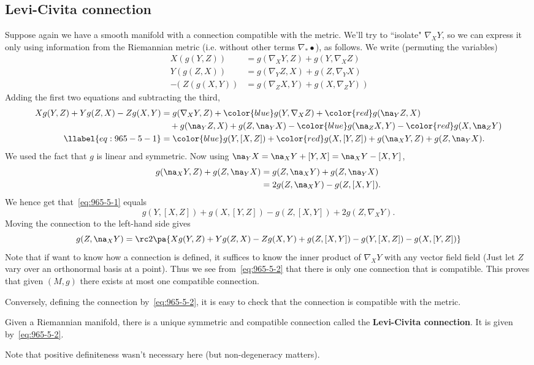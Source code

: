 \subsection{Levi-Civita connection}
Suppose again we have a smooth manifold with a connection compatible with the metric. We'll try to ``isolate" $\nabla_XY$, so we can express it only using information from the Riemannian metric (i.e. without other terms $\nabla_*\bullet$), as follows. We write (permuting the variables)
\begin{align*}
X(g(Y,Z))&=g(\nabla_XY,Z)+g(Y,\nabla_XZ)\\
Y(g(Z,X))&=g(\nabla_YZ,X)+g(Z,\nabla_YX)\\
-(\;Z(g(X,Y))&=g(\nabla_ZX,Y)+g(X,\nabla_ZY)\;)
\end{align*}
Adding the first two equations and subtracting the third,
\begin{align}
\nonumber
Xg(Y,Z)+Yg(Z,X)-Zg(X,Y)
&=g(\nabla_XY,Z)+{\color{blue}g(Y,\nabla_XZ)}+{\color{red}g(\na_YZ,X)}\\
\nonumber
&\quad
+g(\na_YZ,X)+g(Z,\na_YX)-{\color{blue}g(\na_ZX,Y)}-{\color{red}g(X,\na_Z Y)}\\
\llabel{eq:965-5-1}
&={\color{blue} g(Y,[X,Z])}+{\color{red} g(X,[Y,Z])}+g(\na_XY,Z)+g(Z,\na_YX).
\end{align}
We used the fact that $g$ is linear and symmetric.
Now using $\na_YX=\na_XY+[Y,X]=\na_{X}Y-[X,Y]$,
\begin{align*}
g(\na_XY,Z)+g(Z,\na_YX)&=g(Z,\na_XY)+g(Z,\na_YX)\\
&=2g(Z,\na_XY)-g(Z,[X,Y]).
\end{align*}
We hence get that~\eqref{eq:965-5-1} equals
\[
g(Y,[X,Z])+g(X,[Y,Z])-g(Z,[X,Y])+2g(Z,\nabla_XY).
\]
Moving the connection to the left-hand side gives
\begin{equation}\label{eq:965-5-2}
g(Z,\na_XY)=\rc2\pa{
Xg(Y,Z)+Yg(Z,X)-Zg(X,Y)+g(Z,[X,Y])-g(Y,[X,Z])-g(X,[Y,Z])
}
\end{equation}
Note that if want to know how a connection is defined, it suffices to know the inner product of $\nabla_XY$ with any vector field field (Just let $Z$ vary over an orthonormal basis at a point).
Thus we see from~\eqref{eq:965-5-2} that there is only one connection that is compatible. This proves that given $(M,g)$ there exists at most one compatible connection.

Conversely, defining the connection by~\eqref{eq:965-5-2}, it is easy to check that the connection is compatible with the metric.
\begin{thm}
Given a Riemannian manifold, there is a unique symmetric and compatible connection called the \textbf{Levi-Civita connection}. It is given by~\eqref{eq:965-5-2}.
\end{thm}
Note that positive definiteness wasn't necessary here (but non-degeneracy matters).

